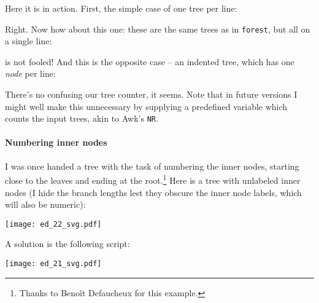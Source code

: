 Here it is in action. First, the simple case of one tree per line:







\noindent{}Right. Now how about this one: these are the same trees as in
\texttt{forest}, but all on a single line:







\noindent{}\luaed{} is not fooled! And this is the opposite case -- an indented tree, which has one \emph{node} per line:







There's no confusing our tree counter, it seems. Note that in future versions I
might well make this unnecessary by supplying a predefined variable which counts
the input trees, akin to Awk's \texttt{NR}.

\paragraph{Numbering inner nodes}

I was once handed a tree with the task of numbering the inner nodes, starting
close to the leaves and ending at the root.\footnote{Thanks to Beno\^{i}t
Defaucheux for this example.} Here is a tree with unlabeled inner nodes (I hide
the branch lengths lest they obscure the inner node labels, which will also be
numeric):


\begin{center}
\texttt{[image: ed\_22\_svg.pdf]}
\end{center}

A solution is the following \luaed{} script:





\begin{center}
\texttt{[image: ed\_21\_svg.pdf]}
\end{center} 


